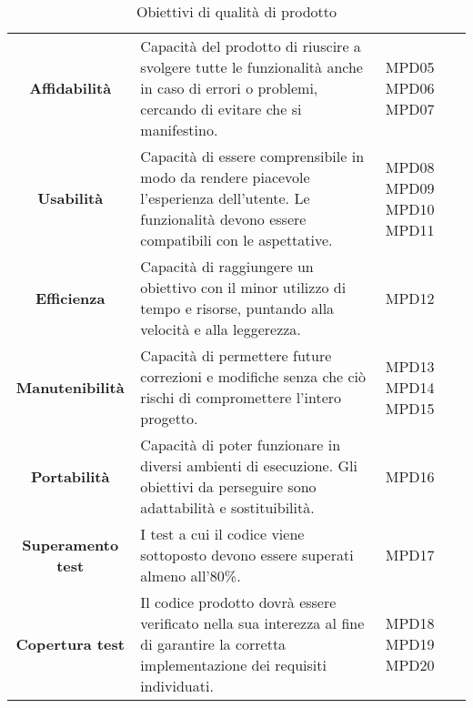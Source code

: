 \begin{table}[H]
\begin{tabular}{c|p{8cm}|p{2cm}}
    \textbf{Affidabilità}            & Capacità del prodotto di riuscire a svolgere tutte le funzionalità anche in caso di errori o problemi, cercando di evitare che si manifestino.        & MPD05 MPD06 MPD07       \\
    \textbf{Usabilità}               & Capacità di essere comprensibile in modo da rendere piacevole l'esperienza dell'utente. Le funzionalità devono essere compatibili con le aspettative. & MPD08 MPD09 MPD10 MPD11 \\
    \textbf{Efficienza}              & Capacità di raggiungere un obiettivo con il minor utilizzo di tempo e risorse, puntando alla velocità e alla leggerezza.                              & MPD12                   \\
    \textbf{Manutenibilità}          & Capacità di permettere future correzioni e modifiche senza che ciò rischi di compromettere l'intero progetto.                                         & MPD13 MPD14 MPD15       \\
    \textbf{Portabilità}             & Capacità di poter funzionare in diversi ambienti di esecuzione. Gli obiettivi da perseguire sono adattabilità e sostituibilità.                       & MPD16                   \\
    \textbf{Superamento test}        & I test a cui il codice viene sottoposto devono essere superati almeno all’80\%.                                                                       & MPD17                   \\
    \textbf{Copertura test}          & Il codice prodotto dovrà essere verificato nella sua interezza al fine di garantire la corretta implementazione dei requisiti individuati.            & MPD18 MPD19 MPD20       \\
  \end{tabular}
  \caption{Obiettivi di qualità di prodotto}
\end{table}



